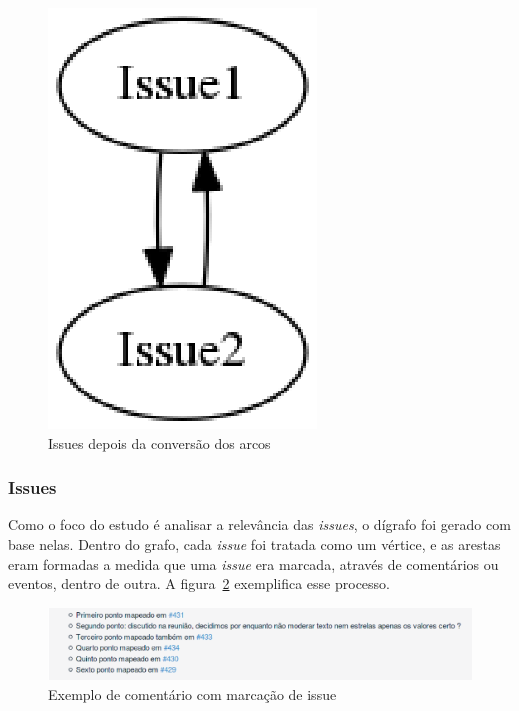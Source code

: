 \begin{figure}[h]
    \centering
        \includegraphics[keepaspectratio=true,scale=0.5]{figuras/directed.eps}
    \caption{Issues depois da conversão dos arcos}
    \label{fig:directed}
\end{figure}

\newpage
\subsubsection{Issues}
\label{est:ran:iss}

Como o foco do estudo é analisar a relevância das \textit{issues}, o dígrafo foi gerado com base nelas. Dentro do grafo, cada \textit{issue} foi tratada como um vértice, e as arestas eram formadas a medida que uma \textit{issue} era marcada, através de comentários ou eventos, dentro de outra. A figura~\ref{fig:issue-comment} exemplifica esse processo.

\begin{figure}[h]
    \centering
        \includegraphics[keepaspectratio=true,scale=0.5]{figuras/issue-comment.eps}
    \caption{Exemplo de comentário com marcação de issue}
    \label{fig:issue-comment}
\end{figure}

